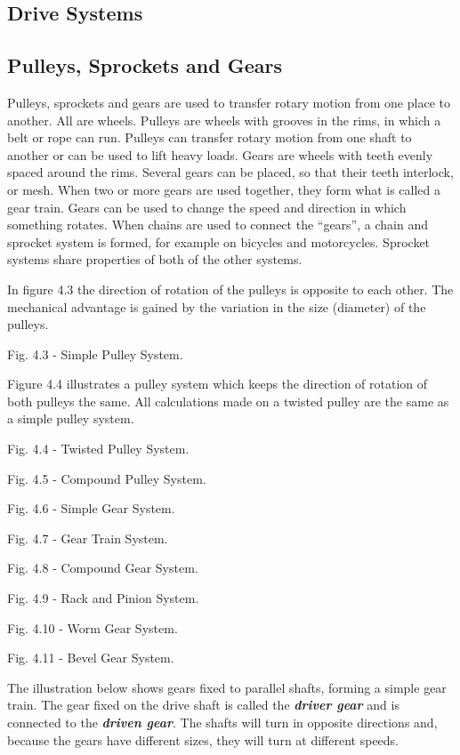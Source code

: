 \documentclass[
]{book}
\begin{document}
\hypertarget{drive-systems}{%
\subsection{Drive Systems}\label{drive-systems}}

\hypertarget{pulleys-sprockets-and-gears}{%
\subsection{Pulleys, Sprockets and Gears}\label{pulleys-sprockets-and-gears}}

Pulleys, sprockets and gears are used to transfer rotary motion from one place to another. All are wheels. Pulleys are wheels with grooves in the rims, in which a belt or rope can run. Pulleys can transfer rotary motion from one shaft to another or can be used to lift heavy loads. Gears are wheels with teeth evenly spaced around the rims. Several gears can be placed, so that their teeth interlock, or mesh. When two or more gears are used together, they form what is called a gear train. Gears can be used to change the speed and direction in which something rotates. When chains are used to connect the ``gears'', a chain and sprocket system is formed, for example on bicycles and motorcycles. Sprocket systems share properties of both of the other systems.

In figure 4.3 the direction of rotation of the pulleys is opposite to each other. The mechanical advantage is gained by the variation in the size (diameter) of the pulleys.

Fig. 4.3 - Simple Pulley System.

Figure 4.4 illustrates a pulley system which keeps the direction of rotation of both pulleys the same. All calculations made on a twisted pulley are the same as a simple pulley system.

Fig. 4.4 - Twisted Pulley System.

Fig. 4.5 - Compound Pulley System.

Fig. 4.6 - Simple Gear System.

Fig. 4.7 - Gear Train System.

Fig. 4.8 - Compound Gear System.

Fig. 4.9 - Rack and Pinion System.

Fig. 4.10 - Worm Gear System.

Fig. 4.11 - Bevel Gear System.

The illustration below shows gears fixed to parallel shafts, forming a simple gear train. The gear fixed on the drive shaft is called the \textbf{\emph{driver gear}} and is connected to the \textbf{\emph{driven gear}}. The shafts will turn in opposite directions and, because the gears have different sizes, they will turn at different speeds.
\end{document}
